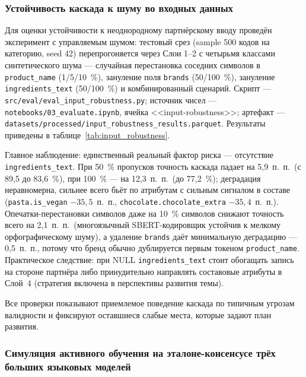 \subsubsection{Устойчивость каскада к шуму во входных данных}

Для оценки устойчивости к неоднородному партнёрскому вводу проведён эксперимент с управляемым шумом: тестовый срез (sample 500 кодов на категорию, seed 42) перепрогоняется через Слои 1--2 с четырьмя классами синтетического шума --- случайная перестановка соседних символов в \texttt{product\_name} (1/5/10~\%), зануление поля \texttt{brands} (50/100~\%), зануление \texttt{ingredients\_text} (50/100~\%) и комбинированный сценарий. Скрипт --- \texttt{src/eval/eval\_input\_robustness.py}; источник чисел --- \texttt{notebooks/03\_evaluate.ipynb}, ячейка <<input-robustness>>; артефакт --- \texttt{datasets/processed/input\_robustness\_results.parquet}. Результаты приведены в таблице~\ref{tab:input_robustness}.



Главное наблюдение: единственный реальный фактор риска --- отсутствие \texttt{ingredients\_text}. При 50~\% пропусков точность каскада падает на 5,9~п.~п.\ (с 89,5 до 83,6~\%), при 100~\% --- на 12,3~п.~п.\ (до 77,2~\%); деградация неравномерна, сильнее всего бьёт по атрибутам с сильным сигналом в составе (\texttt{pasta.is\_vegan} $-35,5$~п.~п., \texttt{chocolate.chocolate\_extra} $-35,4$~п.~п.). Опечатки-перестановки символов даже на 10~\% символов снижают точность всего на 2,1~п.~п.\ (многоязычный SBERT-кодировщик устойчив к мелкому орфографическому шуму), а удаление \texttt{brands} даёт минимальную деградацию --- 0,5~п.~п., потому что бренд обычно дублируется первым токеном \texttt{product\_name}. Практическое следствие: при NULL \texttt{ingredients\_text} стоит обогащать запись на стороне партнёра либо принудительно направлять составовые атрибуты в Слой~4 (стратегия включена в перспективы развития темы).

Все проверки показывают приемлемое поведение каскада по типичным угрозам валидности и фиксируют оставшиеся слабые места, которые задают план развития.

\subsubsection{Симуляция активного обучения на эталоне-консенсусе трёх больших языковых моделей}
\label{sec:active_learning_sim}


